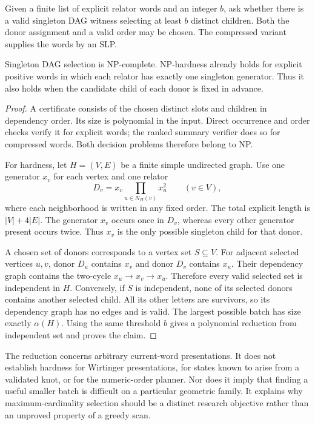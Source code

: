 \begin{definition}
\label{alg:selection-problem}
Given a finite list of explicit relator words and an integer $b$, ask
whether there is a valid singleton DAG witness selecting at least
$b$ distinct children. Both the donor assignment and a valid order
may be chosen. The compressed variant supplies the words by an SLP.
\end{definition}

\begin{theorem}
\label{alg:selection-hardness}
Singleton DAG selection is NP-complete. NP-hardness already holds for
explicit positive words in which each relator has exactly one
singleton generator. Thus it also holds when the candidate child of
each donor is fixed in advance.
\end{theorem}

\begin{proof}
A certificate consists of the chosen distinct slots and children in
dependency order. Its size is polynomial in the input. Direct
occurrence and order checks verify it for explicit words; the ranked
summary verifier does so for compressed words. Both decision problems
therefore belong to NP.

For hardness, let $H=(V,E)$ be a finite simple undirected graph. Use
one generator $x_v$ for each vertex and one relator
\[
 D_v=x_v\prod_{u\in N_H(v)}x_u^2
 \qquad(v\in V),
\]
where each neighborhood is written in any fixed order. The total
explicit length is $|V|+4|E|$. The generator $x_v$ occurs once in
$D_v$, whereas every other generator present occurs twice. Thus
$x_v$ is the only possible singleton child for that donor.

A chosen set of donors corresponds to a vertex set $S\subseteq V$.
For adjacent selected vertices $u,v$, donor $D_u$ contains $x_v$ and
donor $D_v$ contains $x_u$. Their dependency graph contains the
two-cycle $x_u\to x_v\to x_u$. Therefore every valid selected set
is independent in $H$. Conversely, if $S$ is independent, none of
its selected donors contains another selected child. All its other
letters are survivors, so its dependency graph has no edges and is
valid. The largest possible batch has size exactly $\alpha(H)$.
Using the same threshold $b$ gives a polynomial reduction from
independent set and proves the claim.
\end{proof}

The reduction concerns arbitrary current-word presentations. It does
not establish hardness for Wirtinger presentations, for states known
to arise from a validated knot, or for the numeric-order planner.
Nor does it imply that finding a useful smaller batch is difficult
on a particular geometric family. It explains why maximum-cardinality
selection should be a distinct research objective rather than an
unproved property of a greedy scan.

